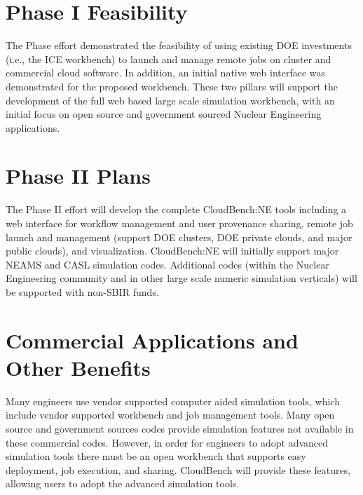 \section*{Phase I Feasibility}
The Phase effort demonstrated the feasibility of using existing DOE
investments (i.e., the ICE workbench) to launch and manage remote jobs
on cluster and commercial cloud software. In addition, an initial
native web interface was demonstrated for the proposed
workbench. These two pillars will support the development of the full
web based large scale simulation workbench, with an initial focus on
open source and government sourced Nuclear Engineering applications.

\section*{Phase II Plans}
The Phase II effort will develop the complete CloudBench:NE tools
including a web interface for workflow management and user provenance
sharing, remote job launch and management (support DOE clusters, DOE
private clouds, and major public clouds), and
visualization. CloudBench:NE will initially support major NEAMS and
CASL simulation codes. Additional codes (within the Nuclear
Engineering community and in other large scale numeric simulation
verticals) will be supported with non-SBIR funds.


\section*{Commercial Applications and Other Benefits}
Many engineers use vendor supported computer aided simulation tools,
which include vendor supported workbench and job management
tools. Many open source and government sources codes provide
simulation features not available in these commercial codes. However,
in order for engineers to adopt advanced simulation tools there must
be an open workbench that supports easy deployment, job execution, and
sharing. CloudBench will provide these features, allowing users to
adopt the advanced simulation tools.

